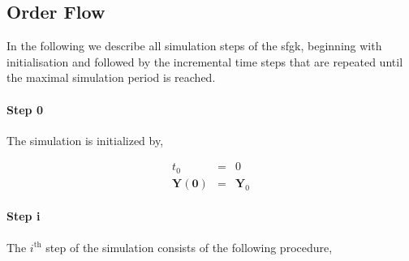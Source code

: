 \documentclass[11pt, a4paper]{thesis}  %
\begin{document}
%
%

\subsection{Order Flow}
\label{section:algo:simulation}

In the following we describe all simulation steps of the \ac{sfgk}, beginning with initialisation and followed by the incremental time steps that are repeated until the maximal  simulation period is reached.


\paragraph{Step 0} The simulation is initialized by,

\begin{eqnarray}
		t_0 &=& 0
		\\\nonumber
		\mathbf{Y(0)} &=& \mathbf{Y}_0
\end{eqnarray}


\paragraph{Step i} The $i^\textrm{th}$ step of the simulation consists of the following procedure, 
\end{document}
